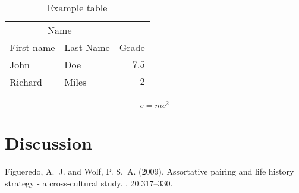 \documentclass[12pt]{article}
\begin{document}
\begin{table}[H]
\caption{Example table}
\centering
\begin{tabular}{llr}
\multicolumn{2}{c}{Name} \\
First name & Last Name & Grade \\
John & Doe & $7.5$ \\
Richard & Miles & $2$ \\
\end{tabular}
\end{table}

\lipsum[5] %

\begin{equation}
\label{eq:emc}
e = mc^2
\end{equation}

\lipsum[6] %


\section{Discussion}

\lipsum[7-8] %


\begin{thebibliography}{99} %

Figueredo, A.~J. and Wolf, P. S.~A. (2009).
\newblock Assortative pairing and life history strategy - a cross-cultural
  study.
, 20:317--330.
 
\end{thebibliography}

\end{document}
